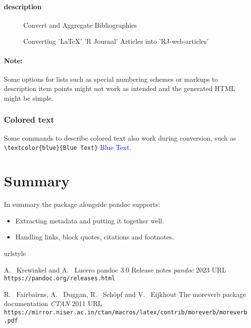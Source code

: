 \paragraph{description}
\begin{description}
\item[] Convert and Aggregate Bibliographies
\item[] Converting 'LaTeX' 'R Journal' Articles into 'RJ-web-articles'
\end{description}

\paragraph{Note:}
Some options for lists such as special numbering schemes or markups to description
item points might not work as intended and the generated HTML might be simple.

\subsubsection{Colored text}
Some commands to describe colored text also work during conversion, such as
\verb|\textcolor{blue}{Blue Text}|  \textcolor{blue}{Blue Text}.

\section{Summary}
In summary the  package alongside pandoc supports:
\begin{itemize}
\item Extracting metadata and putting it together well.
\item Handling links, block quotes, citations and footnotes.
\end{itemize}

\begin{thebibliography}{2}
    \providecommand{\natexlab}[1]{#1}
    \providecommand{\url}[1]{\texttt{#1}}
    \expandafter\ifx\csname urlstyle\endcsname\relax
      \providecommand{\doi}[1]{doi: #1}\else
      \providecommand{\doi}{doi: \begingroup \urlstyle{rm}\Url}\fi

A.~ Krewinkel and A.~ Lucero
\newblock pandoc 3.0 Release notes
\newblock \emph{pandoc}  2023
\newblock URL \url{https://pandoc.org/releases.html}

R.~ Fairbairns, A.~ Duggan, R.~ Schöpf and V.~ Eijkhout
\newblock The moreverb package documentation
\newblock \emph{CTAN}  2011
\newblock URL \url{https://mirror.niser.ac.in/ctan/macros/latex/contrib/moreverb/moreverb.pdf}

\end{thebibliography}


\address{%
Abhishek Ulayil\\
Institute of Actuaries of India (Student)\\%
Mumbai, India\\
ORCiD: 0009-0000-6935-8690\\
}

